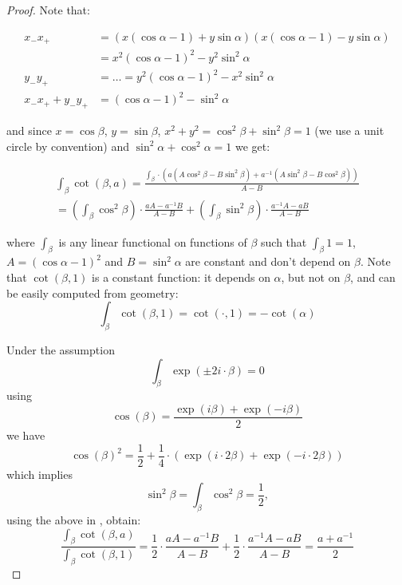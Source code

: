 \begin{proof}
\noindent Note that:

\begin{align*}
x_- x_+ &= (x (\cos \alpha - 1) + y \sin \alpha) (x (\cos \alpha - 1) - y \sin \alpha) \\&= x^2 (\cos \alpha - 1)^2 - y^2 \sin^2 \alpha \\
y_- y_+ &= \dots                                                   = y^2 (\cos \alpha - 1)^2 - x^2 \sin^2 \alpha \\
x_- x_+ + y_- y_+                                                 &= (\cos \alpha - 1)^2 - \sin^2 \alpha 
\end{align*}

\noindent and since $x=\cos{\beta}$, $y=\sin{\beta}$, 
$x^2 + y^2 = \cos^2{\beta} + \sin^2{\beta} = 1$ (we use a unit circle by convention)
and $\sin^2 \alpha + \cos^2 \alpha = 1$ we get:

\begin{multline}
\label{eqn:3}
\int_\beta \cot(\beta,a)
= \frac{\int_\beta \cdot ( a (A \cos^2 \beta - B \sin^2 \beta) + a^{-1} (A \sin^2 \beta - B \cos^2 \beta))}{A-B} 
\\
= \left(\int_\beta \cos^2 \beta \right) \cdot \frac{a A-a^{-1}B}{A-B}
+ \left(\int_\beta \sin^2 \beta \right) \cdot \frac{a^{-1}A-a B}{A-B}
\end{multline}

\noindent where $\int_\beta$ is any linear functional on functions of $\beta$ such that $\int_\beta 1 = 1$,
$A = (\cos \alpha - 1)^2$ and $B = \sin^2 \alpha$ are constant and don't depend on $\beta$.
Note that $\cot(\beta,1)$ is a constant function:
it depends on $\alpha$, but not on $\beta$,
and can be easily computed from geometry:
\[ \int_\beta \cot(\beta,1) = \cot(\cdot,1) = -\cot(\alpha) \]

Under the assumption
\begin{equation}
 \label{fourier-2}
 \int_\beta  \exp(\pm2i\cdot\beta) = 0
\end{equation}
using
\[\cos(\beta) = \frac{\exp(i\beta) + \exp(-i\beta)}2 \]
we have
\[ \cos(\beta)^2 = \frac12 + \frac14\cdot{(\exp(i\cdot2\beta) + \exp(-i\cdot2\beta))} \]
which implies
\[
\sin^2 \beta = \int_\beta \cos^2 \beta = \frac12,
\]
using the above in , obtain:
\begin{equation*}
\frac{\int_\beta \cot(\beta,a)}{\int_\beta \cot(\beta,1)}
= \frac12 \cdot \frac{aA-a^{-1}B}{A-B}
+ \frac12 \cdot \frac{a^{-1}A-a B}{A-B}
= \frac{a+a^{-1}}2
\end{equation*}


\end{proof}
